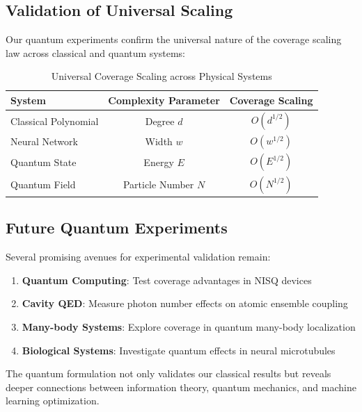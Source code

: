 \subsection{Validation of Universal Scaling}

Our quantum experiments confirm the universal nature of the coverage scaling law across classical and quantum systems:

\begin{table}[t]
\caption{Universal Coverage Scaling across Physical Systems}
\label{table:universal-scaling}
\vskip 0.15in
\begin{center}
\begin{small}
\begin{sc}
\begin{tabular}{lcc}
\toprule
System & Complexity Parameter & Coverage Scaling \\
\midrule
Classical Polynomial & Degree $d$ & $O(d^{1/2})$ \\
Neural Network & Width $w$ & $O(w^{1/2})$ \\
Quantum State & Energy $E$ & $O(E^{1/2})$ \\
Quantum Field & Particle Number $N$ & $O(N^{1/2})$ \\
\bottomrule
\end{tabular}
\end{sc}
\end{small}
\end{center}
\vskip -0.1in
\end{table}

\subsection{Future Quantum Experiments}

Several promising avenues for experimental validation remain:

\begin{enumerate}
    \item \textbf{Quantum Computing}: Test coverage advantages in NISQ devices
    \item \textbf{Cavity QED}: Measure photon number effects on atomic ensemble coupling
    \item \textbf{Many-body Systems}: Explore coverage in quantum many-body localization
    \item \textbf{Biological Systems}: Investigate quantum effects in neural microtubules
\end{enumerate}

The quantum formulation not only validates our classical results but reveals deeper connections between information theory, quantum mechanics, and machine learning optimization.